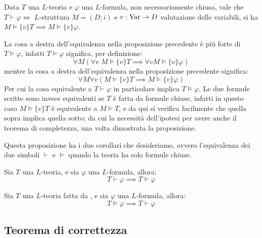 \begin{proposition}
    Data $T$ una $L$-teoria e $\varphi$ una $L$-formula, non necessariamente chiusa, vale che $T \vdash \varphi \iff$ 
    $L$-struttura $M = (D;i)$ e  $v : \operatorname{Var} \to D$ valutazione delle variabili, si ha $M \models \{v\}T \implies M \models \{v\}\varphi$.
\end{proposition}

\begin{remark}
    La cosa a destra dell'equivalenza nella proposizione precedente è più forte di $T \models \varphi$, infatti $T \models \varphi$ significa, per definizione:
    \[ \forall M ( \forall v \; M \models \{v\}T \implies \forall v M \models \{v\}\varphi) \]
    mentre la cosa a destra dell'equivalenza nella proposizione precedente significa:
    \[ \forall M \forall v ( M \models \{v\}T \implies M \models \{v\}\varphi) \]
    Per cui la cosa equivalente a $T \vdash \varphi$ in particolare implica $T \models \varphi$. Le due formule scritte sono invece equivalenti se $T$ è fatta da formule chiuse, infatti in questo caso $M \models \{v\}T$ è equivalente a $M \models T$, e da qui si verifica facilmente che quella sopra implica quella sotto;
    da cui la necessità dell'ipotesi per avere anche il teorema di completezza, una volta dimostrata la proposizione.
\end{remark}

Questa proposizione ha i due corollari che desideriamo, ovvero l'equivalenza dei due simboli $\vdash$ e $\models$ quando la teoria ha solo formule chiuse.

\begin{corollary}
    Sia $T$ una $L$-teoria, e sia $\varphi$ una $L$-formula, allora:
    \[T \vdash \varphi \implies T \models \varphi\]
\end{corollary}

\begin{corollary}
    Sia $T$ una $L$-teoria fatta da , e sia $\varphi$ una $L$-formula, allora:
    \[T \models \varphi \implies T \vdash \varphi\]
\end{corollary}

\subsection{Teorema di correttezza}

